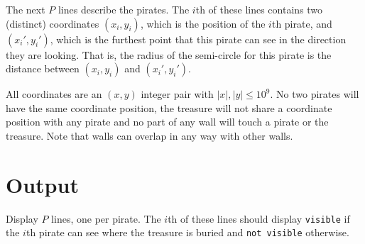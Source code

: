 The next $P$ lines describe the pirates. The $i$th of these lines contains two (distinct) coordinates $(x_i,y_i)$, which is the position of the $i$th pirate, and $(x_i',y_i')$, which is the furthest point that this pirate can see in the direction they are looking. That is, the radius of the semi-circle for this pirate is the distance between $(x_i, y_i)$ and $(x_i',y_i')$.

All coordinates are an $(x,y)$ integer pair with $|x|,|y| \leq 10^9$. No two pirates will have the same coordinate position, the treasure will not share a coordinate position with any pirate and no part of any wall will touch a pirate or the treasure. Note that walls can overlap in any way with other walls.

\section*{Output}

Display $P$ lines, one per pirate. The $i$th of these lines should display \texttt{visible} if the $i$th pirate can see where the treasure is buried and \texttt{not visible} otherwise.
